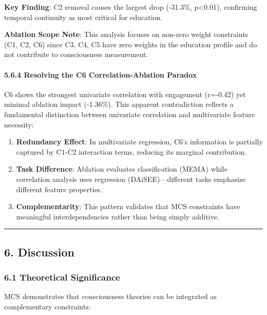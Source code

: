 \documentclass[
]{article}
\providecommand{\tightlist}{%
  \setlength{\itemsep}{0pt}\setlength{\parskip}{0pt}}
\begin{document}
\textbf{Key Finding}: C2 removal causes the largest drop (-31.3\%,
p\textless0.01), confirming temporal continuity as most critical for
education.

\textbf{Ablation Scope Note}: This analysis focuses on non-zero weight
constraints (C1, C2, C6) since C3, C4, C5 have zero weights in the
education profile and do not contribute to consciousness measurement.

\paragraph{5.6.4 Resolving the C6 Correlation-Ablation
Paradox}\label{resolving-the-c6-correlation-ablation-paradox}

C6 shows the strongest univariate correlation with engagement (r=-0.42)
yet minimal ablation impact (-1.36\%). This apparent contradiction
reflects a fundamental distinction between univariate correlation and
multivariate feature necessity:

\begin{enumerate}
\def\labelenumi{\arabic{enumi}.}
\tightlist
\item
  \textbf{Redundancy Effect}: In multivariate regression, C6's
  information is partially captured by C1-C2 interaction terms, reducing
  its marginal contribution.
\item
  \textbf{Task Difference}: Ablation evaluates classification (MEMA)
  while correlation analysis uses regression (DAiSEE)---different tasks
  emphasize different feature properties.
\item
  \textbf{Complementarity}: This pattern validates that MCS constraints
  have meaningful interdependencies rather than being simply additive.
\end{enumerate}

\begin{center}\rule{0.5\linewidth}{0.5pt}\end{center}

\subsection{6. Discussion}\label{discussion}

\subsubsection{6.1 Theoretical
Significance}\label{theoretical-significance}

MCS demonstrates that consciousness theories can be integrated as
complementary constraints:
\end{document}
